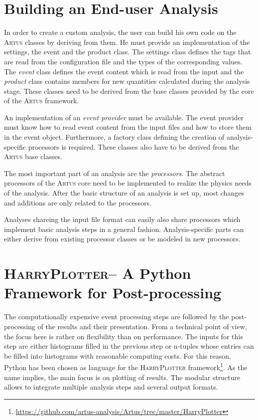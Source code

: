\documentclass[3p]{elsarticle}
\newcommand{\software}[1]{\textsc{#1}\xspace}
\newcommand{\artus}{\software{Artus}}
\newcommand{\harryplotter}{\software{HarryPlotter}}
\begin{document}
\section{Building an End-user Analysis}
\label{section_artus_analysis}
In order to create a custom analysis, the user can build his own code on the \artus classes by deriving from them.
He must provide an implementation of the settings, the event and the product class.
The settings class defines the tags that are read from the configuration file and the types of the corresponding values.
The \emph{event} class defines the event content which is read from the input and the \emph{product} class contains members for new quantities calculated during the analysis stage.
These classes need to be derived from the base classes provided by the core of the \artus framework.

An implementation of an \emph{event provider} must be available.
The event provider must know how to read event content from the input files and how to store them in the event object.
Furthermore, a factory class defining the creation of analysis-specific processors is required.
These classes also have to be derived from the \artus base classes.

The most important part of an analysis are the \emph{processors}.
The abstract processors of the \artus core need to be implemented to realize the physics needs of the analysis.
After the basic structure of an analysis is set up, most changes and additions are only related to the processors.

Analyses shareing the input file format can easily also share processors which implement basic analysis steps in a general fashion.
Analysis-specific parts can either derive from existing processor classes or be modeled in new processors.


\section{\harryplotter -- A Python Framework for Post-processing}
\label{section_artus_harryplotter}

The computationally expensive event processing steps are followed by the post-processing of the results and their presentation.
From a technical point of view, the focus here is rather on flexibility than on performance.
The inputs for this step are either histograms filled in the previous step or n-tuples whose entries can be filled into histograms with reasonable computing costs.
For this reason, Python has been chosen as language for the \harryplotter framework\footnote{\url{https://github.com/artus-analysis/Artus/tree/master/HarryPlotter}}.
As the name implies, the main focus is on plotting of results.
The modular structure allows to integrate multiple analysis steps and several output formats.
\end{document}
